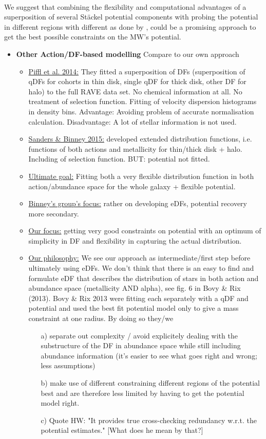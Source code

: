 \\We suggest that combining the flexibility and computational advantages of a superposition of several St\"{a}ckel potential components with probing the potential in different regions with different \MAPs as done by \citet{bov13}, could be a promising approach to get the best possible constraints on the MW's potential.

\begin{itemize}
\item \textbf{Other Action/DF-based modelling} Compare to our own approach

\begin{itemize}
\item \underline{Piffl et al. 2014:} They fitted a superposition of DFs (superposition of qDFs for cohorts in thin disk, single qDF for thick disk, other DF for halo) to the full RAVE data set. No chemical information at all. No treatment of selection function. Fitting of velocity dispersion histograms in density bins. Advantage: Avoiding problem of accurate normalisation calculation. Disadvantage: A lot of stellar information is not used.
\item  \underline{Sanders \& Binney 2015:} developed extended distribution functions, i.e. functions of both actions and metallicity for thin/thick disk + halo. Including of selection function. BUT: potential not fitted.
\item \underline{Ultimate goal:} Fitting both a very flexible distribution function in both action/abundance space for the whole galaxy + flexible potential.
\item \underline{Binney's group's focus:} rather on developing eDFs, potential recovery more secondary.
\item \underline{Our focus:} getting very good constraints on potential with an optimum of simplicity in DF and flexibility in capturing the actual distribution. 
\item \underline{Our philosophy:} We see our approach as intermediate/first step before ultimately using eDFs. We don't think that there is an easy to find and formulate eDF that describes the distribution of stars in both action and abundance space (metallicity AND alpha), see fig. 6 in Bovy \& Rix (2013). Bovy \& Rix 2013 were fitting each \MAP separately with a qDF and potential and used the best fit potential model only to give a mass constraint at one radius. By doing so they/we 
\begin{itemize}
\item[a)] separate out complexity / avoid explicitely dealing with the substructure of the DF in abundance space while still including abundance information (it's easier to see what goes right and wrong; less assumptions) 
\item[b)] make use of different \MAPs constraining different regions of the potential best and are therefore less limited by having to get the potential model right.
\item[c)] Quote HW: "It provides true cross-checking redundancy w.r.t. the potential estimates." [What does he mean by that?]
\end{itemize}
\end{itemize}


\end{itemize}

